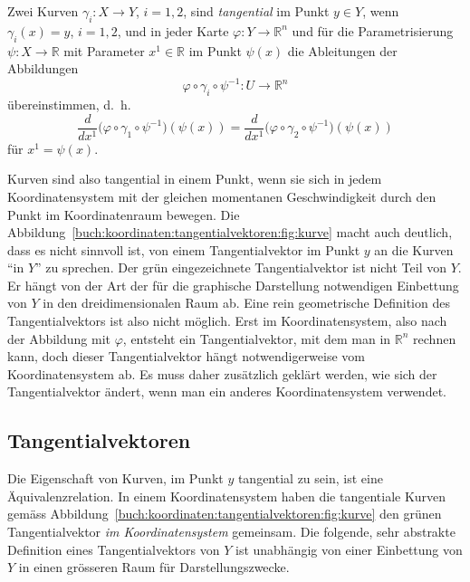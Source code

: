 %

\begin{definition}
%
Zwei Kurven $\gamma_i\colon X\to Y$, $i=1,2$, sind
{\em tangential} im Punkt $y\in Y$, wenn
$\gamma_i(x) = y$, $i=1,2$, und
in jeder Karte
$\varphi\colon Y\to\mathbb{R}^n$ und für die Parametrisierung
$\psi\colon X\to \mathbb{R}$ mit Parameter $x^1\in\mathbb{R}$ 
im Punkt $\psi(x)$ die Ableitungen der Abbildungen
\[
\varphi
\circ
\gamma_i
\circ
\psi^{-1}
\colon
U\to\mathbb{R}^n
\]
übereinstimmen, d.~h.
\begin{equation}
\frac{d}{dx^1}
\bigl(\varphi\circ\gamma_1\circ\psi^{-1}\bigr)(\psi(x))
=
\frac{d}{dx^1}
\bigl(\varphi\circ\gamma_2\circ\psi^{-1}\bigr)(\psi(x))
\label{buch:koordinaten:tangentialvektoren:eqn:tangential}
\end{equation}
für $x^1=\psi(x)$.
\end{definition}

Kurven sind also tangential in einem Punkt, wenn sie sich in jedem
Koordinatensystem mit der gleichen momentanen Geschwindigkeit
%
durch den Punkt im Koordinatenraum bewegen.
Die Abbildung~\ref{buch:koordinaten:tangentialvektoren:fig:kurve}
macht auch deutlich, dass es nicht sinnvoll ist, von einem
Tangentialvektor im Punkt $y$ an die Kurven ``in $Y$'' zu sprechen.
Der grün eingezeichnete Tangentialvektor ist nicht Teil von $Y$.
Er hängt von der Art der für die graphische Darstellung notwendigen
Einbettung von $Y$ in den dreidimensionalen Raum ab.
Eine rein geometrische Definition des Tangentialvektors ist also
nicht möglich.
Erst im Koordinatensystem, also nach der Abbildung mit $\varphi$,
entsteht ein Tangentialvektor, mit dem man in $\mathbb{R}^n$
rechnen kann, doch dieser Tangentialvektor hängt notwendigerweise
vom Koordinatensystem ab.
Es muss daher zusätzlich geklärt werden, wie sich der Tangentialvektor
ändert, wenn man ein anderes Koordinatensystem verwendet.

%
%
\subsection{Tangentialvektoren}
Die Eigenschaft von Kurven, im Punkt $y$ tangential zu sein, ist
eine Äquivalenzrelation.
In einem Koordinatensystem haben die tangentiale Kurven gemäss
Abbildung~\ref{buch:koordinaten:tangentialvektoren:fig:kurve}
den grünen Tangentialvektor \emph{im Koordinatensystem} gemeinsam.
Die folgende, sehr abstrakte Definition eines Tangentialvektors
von $Y$ ist unabhängig von einer Einbettung von $Y$ in einen
grösseren Raum für Darstellungszwecke.

